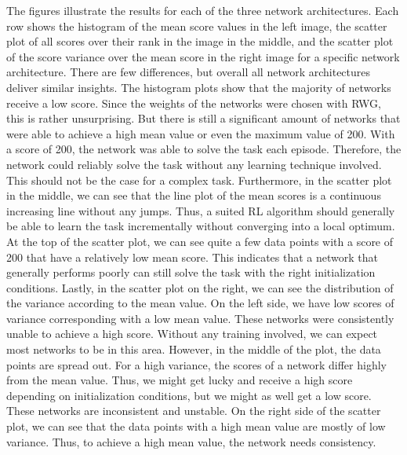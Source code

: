 The figures illustrate the results for each of the three network architectures. Each row shows the histogram of the mean score values in the left image, the scatter plot of all scores over their rank in the image in the middle, and the scatter plot of the score variance over the mean score in the right image for a specific network architecture. There are few differences, but overall all network architectures deliver similar insights. The histogram plots show that the majority of networks receive a low score. Since the weights of the networks were chosen with RWG, this is rather unsurprising. But there is still a significant amount of networks that were able to achieve a high mean value or even the maximum value of 200. With a score of 200, the network was able to solve the task each episode. Therefore, the network could reliably solve the task without any learning technique involved. This should not be the case for a complex task. Furthermore, in the scatter plot in the middle, we can see that the line plot of the mean scores is a continuous increasing line without any jumps. Thus, a suited RL algorithm should generally be able to learn the task incrementally without converging into a local optimum. At the top of the scatter plot, we can see quite a few data points with a score of 200 that have a relatively low mean score. This indicates that a network that generally performs poorly can still solve the task with the right initialization conditions. Lastly, in the scatter plot on the right, we can see the distribution of the variance according to the mean value. On the left side, we have low scores of variance corresponding with a low mean value. These networks were consistently unable to achieve a high score. Without any training involved, we can expect most networks to be in this area. However, in the middle of the plot, the data points are spread out. For a high variance, the scores of a network differ highly from the mean value. Thus, we might get lucky and receive a high score depending on initialization conditions, but we might as well get a low score. These networks are inconsistent and unstable. On the right side of the scatter plot, we can see that the data points with a high mean value are mostly of low variance. Thus, to achieve a high mean value, the network needs consistency.

